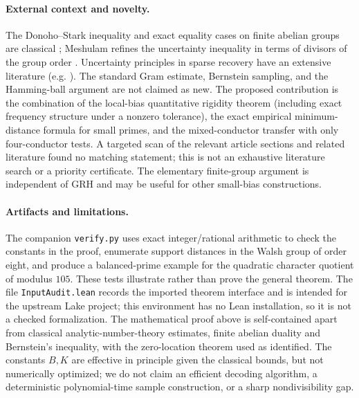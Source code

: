 \documentclass[11pt]{article}
\theoremstyle{definition}\newtheorem{remark}[theorem]{Remark}
\begin{document}
\paragraph{External context and novelty.} The Donoho--Stark inequality and exact equality cases on finite abelian groups are classical \cite{MOP}; Meshulam refines the uncertainty inequality in terms of divisors of the group order \cite{Meshulam}. Uncertainty principles in sparse recovery have an extensive literature (e.g. \cite{IM}). The standard Gram estimate, Bernstein sampling, and the Hamming-ball argument are not claimed as new. The proposed contribution is the combination of the local-bias quantitative rigidity theorem (including exact frequency structure under a nonzero tolerance), the exact empirical minimum-distance formula for small primes, and the mixed-conductor transfer with only four-conductor tests. A targeted scan of the relevant article sections and related literature found no matching statement; this is not an exhaustive literature search or a priority certificate. The elementary finite-group argument is independent of GRH and may be useful for other small-bias constructions.

\paragraph{Artifacts and limitations.} The companion \texttt{verify.py} uses exact integer/rational arithmetic to check the constants in the proof, enumerate support distances in the Walsh group of order eight, and produce a balanced-prime example for the quadratic character quotient of modulus $105$. These tests illustrate rather than prove the general theorem. The file \texttt{InputAudit.lean} records the imported theorem interface and is intended for the upstream Lake project; this environment has no Lean installation, so it is not a checked formalization. The mathematical proof above is self-contained apart from classical analytic-number-theory estimates, finite abelian duality and Bernstein's inequality, with the zero-location theorem used as identified. The constants $B,K$ are effective in principle given the classical bounds, but not numerically optimized; we do not claim an efficient decoding algorithm, a deterministic polynomial-time sample construction, or a sharp nondivisibility gap.
\end{document}
